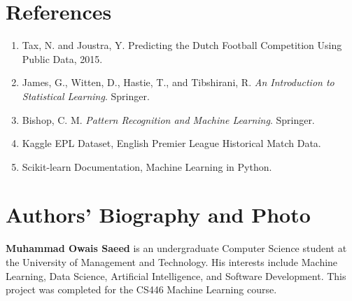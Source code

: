 \documentclass[10pt,a4paper]{article}
\begin{document}
\section{References}
\begin{enumerate}
    \item Tax, N. and Joustra, Y. Predicting the Dutch Football Competition Using Public Data, 2015.
    \item James, G., Witten, D., Hastie, T., and Tibshirani, R. \textit{An Introduction to Statistical Learning}. Springer.
    \item Bishop, C. M. \textit{Pattern Recognition and Machine Learning}. Springer.
    \item Kaggle EPL Dataset, English Premier League Historical Match Data.
    \item Scikit-learn Documentation, Machine Learning in Python.
\end{enumerate}

\section{Authors' Biography and Photo}
\textbf{Muhammad Owais Saeed} is an undergraduate Computer Science student at the University of Management and Technology. His interests include Machine Learning, Data Science, Artificial Intelligence, and Software Development. This project was completed for the CS446 Machine Learning course.

\vspace{0.4cm}
\noindent{}
\end{document}
